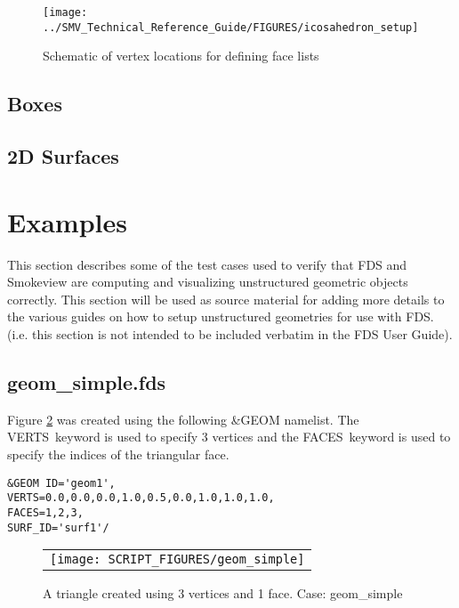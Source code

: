\documentclass[12pt]{article}
\begin{document}
\begin{figure}[\figoptions]
\begin{center}
\texttt{[image: ../SMV\_Technical\_Reference\_Guide/FIGURES/icosahedron\_setup]}
\end{center}
\caption{Schematic of vertex locations for defining face lists}
\label{figure:facelist}
\end{figure}

\subsection{Boxes}
\subsection{2D Surfaces}

\section{Examples}
This section describes some of the test cases used to verify that FDS and Smokeview are computing
and visualizing unstructured geometric objects correctly.  This section will be used as source material for adding
more details to the various guides on how to setup unstructured geometries for use with FDS. (i.e. this section
is not intended to be included verbatim in the FDS User Guide).

\newcommand{\geominput}[1]{{\scriptsize}}
\newcommand{\figheightD}{2.75in}

\subsection{geom\_simple.fds}
Figure \ref{fig:geom_simple} was created using the following \&GEOM namelist.
The {\ct VERTS}\ keyword is used to specify 3 vertices and the {\ct FACES}\ keyword
is used to specify the indices of the triangular face.

{\small
\begin{verbatim}
&GEOM ID='geom1',
VERTS=0.0,0.0,0.0,1.0,0.5,0.0,1.0,1.0,1.0,
FACES=1,2,3,
SURF_ID='surf1'/
\end{verbatim}
}

\begin{figure}[\figoptions]
\begin{center}
\begin{tabular}{c}
 \texttt{[image: SCRIPT\_FIGURES/geom\_simple]}
  \end{tabular}
\end{center}
 \caption{A triangle created using 3 vertices and 1 face. Case: geom\_simple}
\label{fig:geom_simple}
\end{figure}
\end{document}

